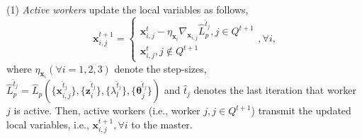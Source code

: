\documentclass[letterpaper]{article}
\begin{document}
\noindent (1) \emph{Active} \emph{workers} update the local variables as follows,
\begin{equation}
\label{eq:update_x1_asyn}
{\boldsymbol{x}_{i,j}^{t+1}} = \left\{ \begin{array}{l}
{\boldsymbol{x}_{i,j}^{t}} - \eta_{\boldsymbol{x}_i} \nabla_{\!\boldsymbol{x}_{i,j}} \widehat{L}_p^{\hat{t}_j}, j\in Q^{t+1}\\
{\boldsymbol{x}_{i,j}^{t}}, j\notin Q^{t+1}
\end{array} \right., \forall i,
\end{equation}
where $\eta_{\boldsymbol{x}_i} (\forall i=1,2,3)$ denote the step-sizes, $\widehat{L}_p^{\hat{t}_j} = \widehat{L}_p(\{{\boldsymbol{x}_{i,j}^{\hat{t}_j}}\} ,\!\{{\boldsymbol{z}_i^{\hat{t}_j}}\}, \!\{\lambda_l^{\hat{t}_j}\}, \!\{\boldsymbol{\theta}_j^{\hat{t}_j}\} )$ and ${\hat{t}_j}$ denotes the last iteration that worker $j$ is active. Then, active workers (i.e., worker $j, j\in Q^{t+1}$) transmit the updated local variables, i.e., $\boldsymbol{x}_{i,j}^{t+1}, \forall i$ to the master.
\end{document}
